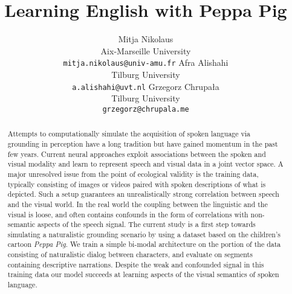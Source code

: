 \documentclass[11pt,a4paper]{article}
\begin{document}
\title{Learning English with Peppa Pig}

\author{Mitja Nikolaus\\
  Aix-Marseille University\\
  \texttt{mitja.nikolaus@univ-amu.fr}
  \And
  Afra Alishahi\\
  Tilburg University\\
  \texttt{a.alishahi@uvt.nl}
  \AND
  Grzegorz Chrupała\\
  Tilburg University\\
  \texttt{grzegorz@chrupala.me}}

\date{}


\maketitle
\begin{abstract}
  Attempts to computationally simulate the acquisition of spoken
  language via grounding in perception have a long tradition
  but have gained momentum in the past few years.  Current neural
  approaches exploit associations between the spoken and
  visual modality and learn to represent speech and visual data
  in a joint vector space. A major unresolved issue from the point
  of ecological validity is the training data, typically consisting of
  images or videos paired with spoken descriptions of what is
  depicted. Such a setup guarantees an unrealistically strong
  correlation between speech and the visual world.  In
  the real world the coupling between the linguistic and the visual is
  loose, and often contains confounds in the form of correlations with
  non-semantic aspects of the speech signal. The current study is a
  first step towards simulating a naturalistic grounding scenario by
  using a dataset based on the children's cartoon {\it Peppa Pig}. We
  train a simple bi-modal architecture on the portion of the data
  consisting of naturalistic dialog between characters, and evaluate
  on segments containing descriptive narrations. Despite the weak and confounded
  signal in this training data our model succeeds at learning aspects
  of the visual semantics of spoken language.
\end{abstract}








%
\end{document}
